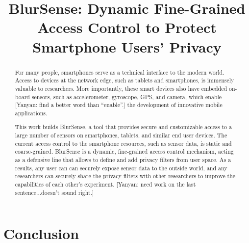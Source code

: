 \documentclass[conference]{IEEEtran}
\newcommand{\blurname}{BlurSense\xspace}
\newcommand{\yanyan}[1]{{\color{blue} [Yanyan: #1]}}
\newcommand{\yanyan}[1]{}
\begin{document}
\title{\blurname: Dynamic Fine-Grained Access Control to Protect 
Smartphone Users’ Privacy}

\author{
\and
{}
}

\maketitle


\begin{abstract}
For many people, smartphones serve as a technical interface to the modern world.
Access to devices at the network edge, such as tablets and smartphones, is
immensely valuable to researchers. More importantly, these smart devices also
have embedded on-board sensors, such as accelerometer, gyroscope, GPS, and
camera, which enable \yanyan{find a better word than ``enable''.} the
development of innovative mobile applications. 

This work builds \blurname, a tool that provides secure and customizable access
to a large number of sensors on smartphones, tablets, and similar end user
devices. The current access control to the smartphone resources, such as sensor
data, is static and coarse-grained. \blurname is a dynamic, fine-grained access
control mechanism, acting as a defensive line that allows to define and add
privacy filters from user space. As a results, any user can can securely expose
sensor data to the outside world, and any researchers can securely share the
privacy filters with other researchers to improve the capabilities of each
other's experiment.
\yanyan{need work on the last sentence...doesn't sound right.}
\end{abstract}

\IEEEpeerreviewmaketitle





\section{Conclusion}






\end{document}
